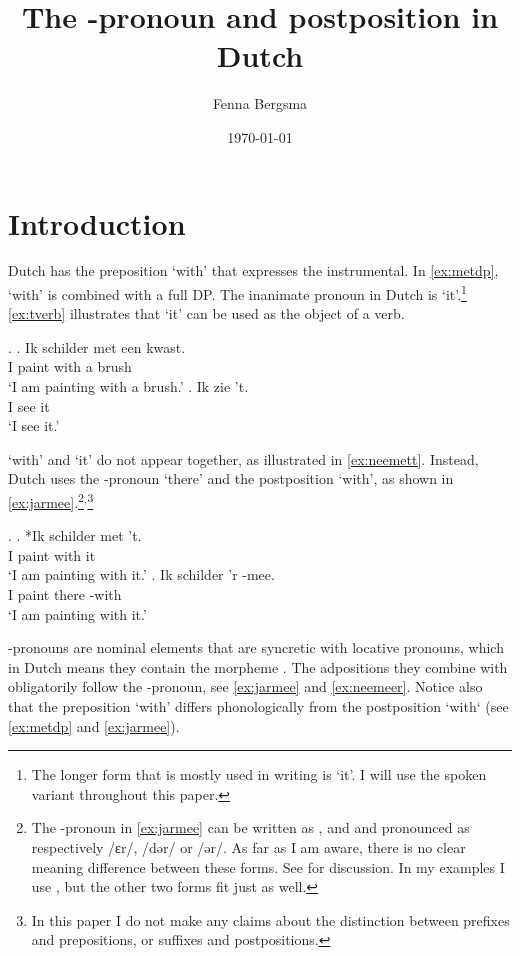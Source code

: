 \documentclass[12pt]{article}
\title{The \tsc{r}-pronoun and postposition \tit{waarmee} in Dutch}
\author{Fenna Bergsma}
\date{\today}
\begin{document}
\maketitle



\section{Introduction}

Dutch has the preposition  `with' that expresses the instrumental. In \ref{ex:metdp},  `with' is combined with a full DP. The inanimate pronoun in Dutch is  `it'.\footnote{The longer form that is mostly used in writing is  `it'. I will use the spoken variant  throughout this paper.} \ref{ex:tverb} illustrates that  `it' can be used as the object of a verb.

\ex.
\ag. Ik schilder met een kwast.\\
 I paint with a brush\\
 `I am painting with a brush.'\label{ex:metdp}
 \bg. Ik zie 't.\\
  I see it\\
  `I see it.'\label{ex:tverb}

 `with' and  `it' do not appear together, as illustrated in \ref{ex:neemett}. Instead, Dutch uses the -pronoun  `there' and the postposition  `with', as shown in \ref{ex:jarmee}.\footnote{The -pronoun  in \ref{ex:jarmee} can be written as ,  and  and pronounced as respectively /ɛr/, /dər/ or /ər/. As far as I am aware, there is no clear meaning difference between these forms. See \citet{wesseling2018} for discussion.
In my examples I use , but the other two forms fit just as well.}$^,$\footnote{In this paper I do not make any claims about the distinction between prefixes and prepositions, or suffixes and postpositions.}

\ex.\label{ex:rmeeconst}
\ag. *Ik schilder met 't.\\
 I paint with it\\
 `I am painting with it.'\label{ex:neemett}
\bg. Ik schilder 'r -mee.\\
 I paint there -with\\
 `I am painting with it.'\label{ex:jarmee}

-pronouns \citep{riemsdijk1978,koopman1994} are nominal elements that are syncretic with locative pronouns, which in Dutch means they contain the morpheme . The adpositions they combine with obligatorily follow the -pronoun, see \ref{ex:jarmee} and \ref{ex:neemeer}.
Notice also that the preposition  `with' differs phonologically from the postposition  `with` (see \ref{ex:metdp} and \ref{ex:jarmee}).
\end{document}
